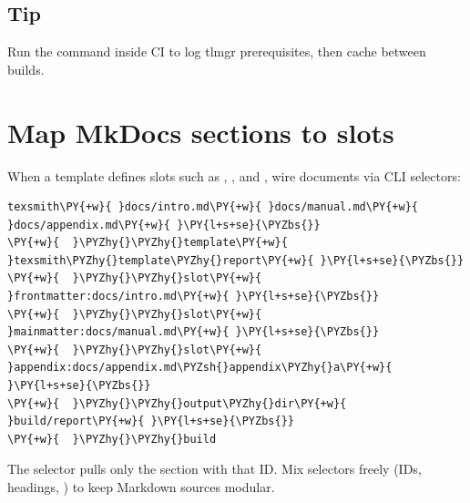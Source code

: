 \documentclass[a4paper,twoside]{article}
\begin{document}
\subsection{Tip}
Run the command inside CI to log tlmgr prerequisites, then cache  between builds.
\section{Map MkDocs sections to slots}
When a template defines slots such as , , and , wire documents via CLI selectors:
\begin{tscode}[lang=bash, engine=pygments]
\begin{Verbatim}[commandchars=\\\{\},breaklines, breakanywhere, commandchars=\\\{\}]
texsmith\PY{+w}{ }docs/intro.md\PY{+w}{ }docs/manual.md\PY{+w}{ }docs/appendix.md\PY{+w}{ }\PY{l+s+se}{\PYZbs{}}
\PY{+w}{  }\PYZhy{}\PYZhy{}template\PY{+w}{ }texsmith\PYZhy{}template\PYZhy{}report\PY{+w}{ }\PY{l+s+se}{\PYZbs{}}
\PY{+w}{  }\PYZhy{}\PYZhy{}slot\PY{+w}{ }frontmatter:docs/intro.md\PY{+w}{ }\PY{l+s+se}{\PYZbs{}}
\PY{+w}{  }\PYZhy{}\PYZhy{}slot\PY{+w}{ }mainmatter:docs/manual.md\PY{+w}{ }\PY{l+s+se}{\PYZbs{}}
\PY{+w}{  }\PYZhy{}\PYZhy{}slot\PY{+w}{ }appendix:docs/appendix.md\PYZsh{}appendix\PYZhy{}a\PY{+w}{ }\PY{l+s+se}{\PYZbs{}}
\PY{+w}{  }\PYZhy{}\PYZhy{}output\PYZhy{}dir\PY{+w}{ }build/report\PY{+w}{ }\PY{l+s+se}{\PYZbs{}}
\PY{+w}{  }\PYZhy{}\PYZhy{}build
\end{Verbatim}
\end{tscode}
The  selector pulls only the section with that ID. Mix selectors freely (IDs, headings, ) to keep Markdown sources modular.
\end{document}
